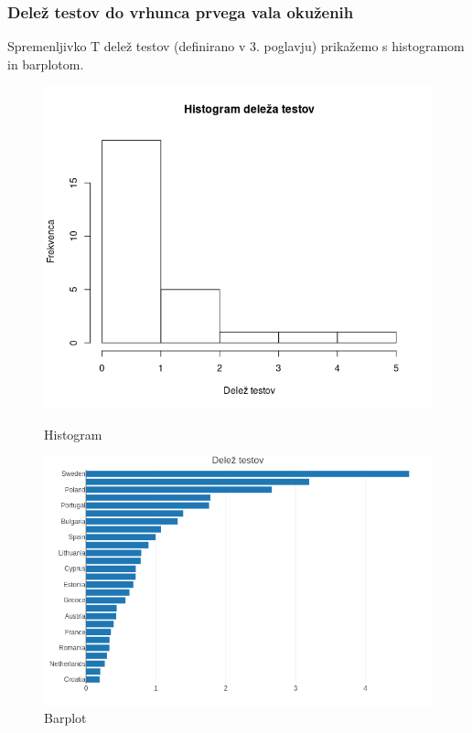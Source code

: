 \documentclass[a4paper,11pt]{article}
\begin{document}
\subsubsection{Delež testov do vrhunca prvega vala okuženih}
Spremenljivko T delež testov (definirano v 3. poglavju) prikažemo s histogramom in barplotom.
\begin{figure}[!htb]
   \begin{minipage}{0.5\textwidth}
     \centering
     \includegraphics[width=1\linewidth]{histogram_delez_testov}
     \caption{Histogram}\label{Fig:Data1}
   \end{minipage}\hfill
   \begin{minipage}{0.5\textwidth}
     \centering
     \includegraphics[width=1\linewidth]{barplot_delez_testov}
     \caption{Barplot}\label{Fig:Data2}
   \end{minipage}
\end{figure}
\end{document}
